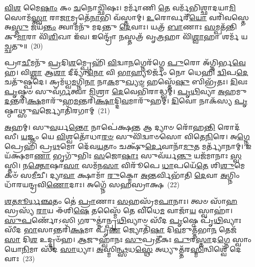 \-\ul{𑌵𑌿}\-\-\ul{𑌶} 𑌮𑍈\-\ul{𑌷𑌾𑌂} 𑌕𑌂 \ul{𑌚}\-𑌨𑍋𑌚𑍍𑌛𑌿᳴𑌷𑌃। 𑌮𑌰𑍍𑌮𑌾᳴𑌣𑌿 \ul{𑌤𑍇} 𑌵𑌰𑍍𑌮᳴𑌭𑌿𑌶𑍍𑌛𑌾𑌦𑌯𑌾\-\ul{𑌮𑌿} 𑌸𑍋𑌮᳴\-\ul{𑌸𑍍𑌤𑍍𑌵𑌾} 𑌰𑌾\-\ul{𑌜𑌾}\-𑌮𑍃𑌤𑍇᳴\-\ul{𑌨𑌾}\-𑌭𑌿 𑌵᳴𑌸𑍍𑌤𑌾𑌮𑍍। \ul{𑌉}\-𑌰𑍋𑌰𑍍𑌵𑌰𑍀᳴\-\ul{𑌯𑍋} 𑌵𑌰𑌿᳴𑌵𑌸𑍍𑌤𑍇 𑌅\-\ul{𑌸𑍍𑌤𑍁} 𑌜𑌯᳴\-\ul{𑌨𑍍𑌤𑌂} 𑌤𑍍𑌵𑌾𑌮𑌨𑍁᳴ 𑌮𑌦𑌨𑍍𑌤𑍁 \ul{𑌦𑍇}\-𑌵𑌾𑌃। 𑌯𑌤𑍍𑌰᳴ \ul{𑌬𑌾}\-𑌣𑌾𑌃 \ul{𑌸}\-𑌮𑍍𑌪𑌤᳴𑌨𑍍𑌤𑌿 𑌕𑍁\-\ul{𑌮𑌾}\-𑌰𑌾 𑌵𑌿᳴\-\ul{𑌶𑌿}\-𑌖𑌾 𑌇᳴𑌵। 𑌇𑌨𑍍𑌦𑍍𑌰𑍋᳴ \ul{𑌨}\-𑌸𑍍𑌤𑌤𑍍𑌰᳴ 𑌵𑍃\-\ul{𑌤𑍍𑌰}\-𑌹𑌾 𑌵𑌿᳴\-\ul{𑌶𑍍𑌵𑌾}\-𑌹𑌾 𑌶𑌰𑍍𑌮᳴ 𑌯𑌚𑍍𑌛𑌤𑍁॥~(20)

{\anuvakamend[{\-\ul{𑌦𑍀}\-\-\ul{𑌯𑌾} \ul{𑌦𑌾}\-𑌯𑍋 𑌜᳴𑌯\-\ul{𑌨𑍍𑌤𑍍𑌵}\-𑌮𑌿\-\ul{𑌤𑍍𑌰𑌾}\-𑌨𑍍𑌪𑍍𑌰 𑌚᳴𑌤𑍍𑌵𑌾\-\ul{𑌰𑌿}\-\-\ul{𑍞}\-𑌶𑌚𑍍𑌚᳴}]}%

𑌪𑍍𑌰𑌾\-\ul{𑌚𑍀}\-𑌮𑌨𑍁᳴ \ul{𑌪𑍍𑌰}\-𑌦𑌿\-\ul{𑌶}\-𑌮𑍍𑌪𑍍𑌰𑍇𑌹𑌿᳴ \ul{𑌵𑌿}\-𑌦𑍍𑌵𑌾\-\ul{𑌨}\-𑌗𑍍𑌨𑍇𑌰᳴𑌗𑍍𑌨𑍇 \ul{𑌪𑍁}\-𑌰𑍋 𑌅᳴𑌗𑍍𑌨𑌿𑌰𑍍𑌭\-\ul{𑌵𑍇}\-𑌹। 𑌵𑌿\-\ul{𑌶𑍍𑌵𑌾} 𑌆\-\ul{𑌶𑌾} 𑌦𑍀𑌦𑍍𑌯𑌾᳴\-\ul{𑌨𑍋} 𑌵𑌿 \ul{𑌭𑌾}\-𑌹𑍍𑌯𑍂𑌰𑍍𑌜𑌂᳴ 𑌨𑍋 𑌧𑍇𑌹𑌿 \ul{𑌦𑍍𑌵𑌿}\-𑌪\-\ul{𑌦𑍇} 𑌚𑌤𑍁᳴𑌷𑍍𑌪𑌦𑍇। 𑌕𑍍𑌰𑌮᳴𑌧𑍍𑌵\-\ul{𑌮}\-𑌗𑍍𑌨𑌿\-\ul{𑌨𑌾} 𑌨𑌾\-\ul{𑌕}\-𑌮𑍁\-\ul{𑌖𑍍𑌯}\-\-\ul{𑍞} 𑌹𑌸𑍍𑌤𑍇᳴\-\ul{𑌷𑍁} 𑌬𑌿𑌭𑍍𑌰᳴𑌤𑌃। \ul{𑌦𑌿}\-𑌵𑌃 \ul{𑌪𑍃}\-𑌷𑍍𑌠𑍞 𑌸𑍁𑌵᳴\-\ul{𑌰𑍍𑌗}\-𑌤𑍍𑌵𑌾 \ul{𑌮𑌿}\-𑌶𑍍𑌰𑌾 \ul{𑌦𑍇}\-𑌵𑍇𑌭𑌿᳴𑌰𑌾𑌦𑍍𑌧𑍍𑌵𑌮𑍍। \ul{𑌪𑍃}\-\-\ul{𑌥𑌿}\-𑌵𑍍𑌯𑌾 \ul{𑌅}\-𑌹𑌮𑍁\-\ul{𑌦}\-𑌨𑍍𑌤𑌰𑌿᳴\-\ul{𑌕𑍍𑌷}\-𑌮𑌾𑌰𑍁᳴𑌹\-\ul{𑌮}\-𑌨𑍍𑌤𑌰𑌿᳴\-\ul{𑌕𑍍𑌷𑌾}\-𑌦𑍍𑌦𑌿\-\ul{𑌵}\-𑌮𑌾𑌰𑍁᳴𑌹𑌮𑍍। \ul{𑌦𑌿}\-𑌵𑍋 𑌨𑌾𑌕᳴𑌸𑍍𑌯 \ul{𑌪𑍃}\-𑌷𑍍𑌠𑌾𑌥𑍍𑌸𑍁\-\ul{𑌵}\-𑌰𑍍𑌜𑍍𑌯𑍋𑌤𑌿᳴𑌰𑌗𑌾𑌮𑍍~(21)

\-\ul{𑌅}\-𑌹𑌮𑍍। 𑌸𑍁\-\ul{𑌵}\-𑌰𑍍𑌯\-\ul{𑌨𑍍𑌤𑍋} 𑌨𑌾𑌪𑍇॑𑌕𑍍𑌷\-\ul{𑌨𑍍𑌤} 𑌆 𑌦𑍍𑌯𑌾𑍞 𑌰𑍋᳴𑌹\-\ul{𑌨𑍍𑌤𑌿} 𑌰𑍋𑌦᳴𑌸𑍀। \ul{𑌯}\-𑌜𑍍𑌞𑌂 𑌯𑍇 \ul{𑌵𑌿}\-𑌶𑍍𑌵𑌤𑍋᳴𑌧𑌾\-\ul{𑌰}\-\-\ul{𑍞} 𑌸𑍁𑌵𑌿᳴𑌦𑍍𑌵𑌾𑍞𑌸𑍋 𑌵𑌿𑌤𑍇\-\ul{𑌨𑌿}\-𑌰𑍇। 𑌅\-\ul{𑌗𑍍𑌨𑍇} 𑌪𑍍𑌰𑍇𑌹𑌿᳴ 𑌪𑍍𑌰\-\ul{𑌥}\-𑌮𑍋 𑌦𑍇᳴𑌵\-\ul{𑌯}\-𑌤𑌾𑌂 𑌚𑌕𑍍𑌷𑍁᳴\-\ul{𑌰𑍍𑌦𑍇}\-𑌵𑌾𑌨𑌾᳴\-\ul{𑌮𑍁}\-𑌤 𑌮𑌰𑍍𑌤𑍍𑌯𑌾᳴𑌨𑌾𑌮𑍍। 𑌇𑌯᳴𑌕𑍍𑌷𑌮𑌾\-\ul{𑌣𑌾} 𑌭𑍃𑌗𑍁᳴𑌭𑌿𑌃 \ul{𑌸}\-𑌜𑍋\-\ul{𑌷𑌾𑌃} 𑌸𑍁𑌵᳴𑌰𑍍𑌯\-\ul{𑌨𑍍𑌤𑍁} 𑌯𑌜᳴𑌮𑌾𑌨𑌾𑌃 \ul{𑌸𑍍𑌵}\-𑌸𑍍𑌤𑌿। 𑌨\-\ul{𑌕𑍍𑌤𑍋}\-𑌷𑌾\-\ul{𑌸𑌾} 𑌸𑌮᳴𑌨\-\ul{𑌸𑌾} 𑌵𑌿𑌰𑍂᳴𑌪𑍇 \ul{𑌧𑌾}\-𑌪𑌯𑍇᳴\-\ul{𑌤𑍇} 𑌶𑌿\-\ul{𑌶𑍁}\-𑌮𑍇𑌕𑍞᳴ 𑌸\-\ul{𑌮𑍀}\-𑌚𑍀। 𑌦𑍍𑌯𑌾\-\ul{𑌵𑌾} 𑌕𑍍𑌷𑌾𑌮𑌾᳴ \ul{𑌰𑍁}\-𑌕𑍍𑌮𑍋 \ul{𑌅}\-𑌨𑍍𑌤𑌰𑍍𑌵𑌿𑌭𑌾᳴𑌤𑌿 \ul{𑌦𑍇}\-𑌵𑌾 \ul{𑌅}\-𑌗𑍍𑌨𑌿𑌂 𑌧𑌾᳴𑌰𑌯𑌨𑍍𑌦𑍍𑌰𑌵𑌿\-\ul{𑌣𑍋}\-𑌦𑌾𑌃। 𑌅𑌗𑍍𑌨𑍇᳴ 𑌸𑌹𑌸𑍍𑌰𑌾𑌕𑍍𑌷~(22)

\-\ul{𑌶}\-\-\ul{𑌤}\-\-\ul{𑌮𑍂}\-\-\ul{𑌰𑍍𑌧}\-\-\ul{𑌞𑍍𑌛}\-𑌤𑌂 𑌤𑍇॑ \ul{𑌪𑍍𑌰𑌾}\-𑌣𑌾𑌃 \ul{𑌸}\-𑌹𑌸𑍍𑌰᳴𑌮\-\ul{𑌪𑌾}\-𑌨𑌾𑌃। 𑌤𑍍𑌵𑍞 𑌸𑌾᳴\-\ul{𑌹}\-𑌸𑍍𑌰𑌸𑍍𑌯᳴ \ul{𑌰𑌾}\-𑌯 𑌈᳴𑌶𑌿\-\ul{𑌷𑍇} 𑌤𑌸𑍍𑌮𑍈᳴ 𑌤𑍇 𑌵𑌿𑌧𑍇\-\ul{𑌮} 𑌵𑌾𑌜𑌾᳴\-\ul{𑌯} 𑌸𑍍𑌵𑌾𑌹𑌾॑। \ul{𑌸𑍁}\-\-\ul{𑌪}\-𑌰𑍍𑌣𑍋᳴\-𑌽𑌸𑌿 \ul{𑌗}\-𑌰𑍁𑌤𑍍𑌮𑌾॑𑌨𑍍𑌪𑍃\-\ul{𑌥𑌿}\-𑌵𑍍𑌯𑌾𑍞 𑌸𑍀᳴𑌦 \ul{𑌪𑍃}\-𑌷𑍍𑌠𑍇 𑌪𑍃᳴\-\ul{𑌥𑌿}\-𑌵𑍍𑌯𑌾𑌃 𑌸𑍀᳴𑌦 \ul{𑌭𑌾}\-𑌸𑌾𑌨𑍍𑌤𑌰𑌿᳴\-\ul{𑌕𑍍𑌷}\-𑌮𑌾 𑌪𑍃᳴\-\ul{𑌣} 𑌜𑍍𑌯𑍋𑌤𑌿᳴\-\ul{𑌷𑌾} 𑌦𑌿\-\ul{𑌵}\-𑌮𑍁𑌤𑍍𑌤᳴𑌭𑌾\-\ul{𑌨} 𑌤𑍇𑌜᳴\-\ul{𑌸𑌾} 𑌦𑌿\-\ul{𑌶} 𑌉𑌦𑍍𑌦𑍃𑍞᳴𑌹। \ul{𑌆}\-𑌜𑍁𑌹𑍍𑌵𑌾᳴𑌨𑌃 \ul{𑌸𑍁}\-𑌪𑍍𑌰𑌤𑍀᳴𑌕𑌃 \ul{𑌪𑍁}\-𑌰\-\ul{𑌸𑍍𑌤𑌾}\-𑌦\-\ul{𑌗𑍍𑌨𑍇} 𑌸𑍍𑌵𑌾𑌂 𑌯𑍋\-\ul{𑌨𑌿}\-𑌮𑌾 𑌸𑍀᳴𑌦 \ul{𑌸𑌾}\-𑌧𑍍𑌯𑌾। \ul{𑌅}\-𑌸𑍍𑌮𑌿\-\ul{𑌨𑍍𑌥𑍍𑌸}\-𑌧\-\ul{𑌸𑍍𑌥𑍇} 𑌅𑌧𑍍𑌯𑍁𑌤𑍍𑌤᳴𑌰\-\ul{𑌸𑍍𑌮𑌿}\-𑌨𑍍𑌵𑌿𑌶𑍍𑌵𑍇᳴ 𑌦𑍇𑌵𑌾𑌃~(23)

